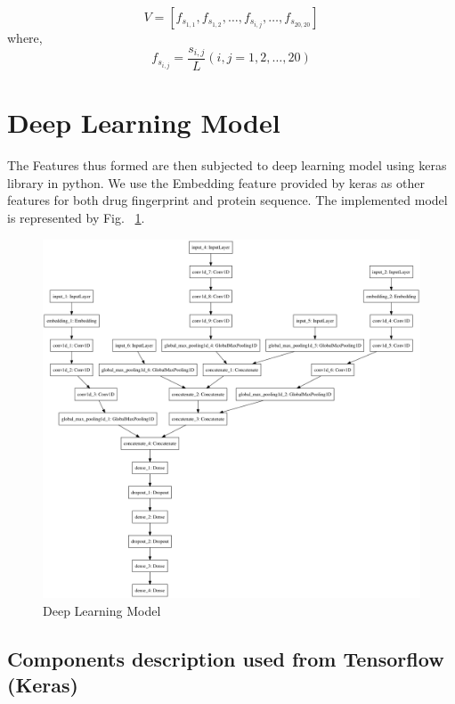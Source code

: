 \begin{equation}
  V = [ f_{s_{1,1}}, f_{s_{1,2}}, \dots, f_{s_{i,j}}, \dots, f_{s_{20,20}} ]
  \label{eq:rptV}
\end{equation}
where, 
\begin{equation}
  f_{s_{i,j}} = \frac{s_{i,j}}{L} (i,j = 1,2,\dots,20)
  \label{eq:rptF}
\end{equation}


\section{Deep Learning Model}

The Features thus formed are then subjected to deep learning model using keras library in python. We use the Embedding feature provided by keras as other features for both drug fingerprint and protein sequence. The implemented model is represented by Fig. ~\ref{fig:dlm}.

\begin{figure}[ht]
\centering
\includegraphics[width=1\linewidth]{mainmatter/3-Methodology/images/build_combined_categorical_tensor_contact_new.png}
\caption{Deep Learning Model}
\label{fig:dlm}
\end{figure}

\subsection{Components description used from Tensorflow (Keras)}
